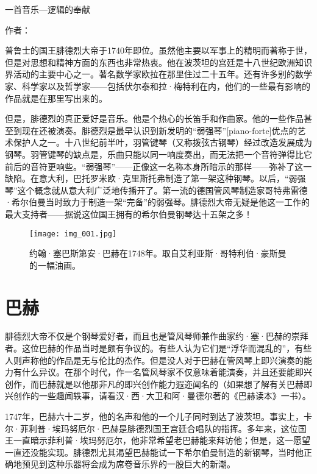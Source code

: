 
\begin{intro}{一首音乐—逻辑的奉献}

\noindent 作者：

普鲁士的国王腓德烈大帝于1740年即位。虽然他主要以军事上的精明而著称于世，但是对思想和精神方面的东西也非常热衷。他在波茨坦的宫廷是十八世纪欧洲知识界活动的主要中心之一。著名数学家欧拉在那里住过二十五年。还有许多别的数学家、科学家以及哲学家——包括伏尔泰和拉·梅特利在内，他们的一些最有影响的作品就是在那里写出来的。

但是，腓德烈的真正爱好是音乐。他是个热心的长笛手和作曲家。他的一些作品甚至到现在还被演奏。腓德烈是最早认识到新发明的“弱强琴”[piano-forte]优点的艺术保护人之一。十八世纪前半叶，羽管键琴（又称拨弦古钢琴）经过改造发展成为钢琴。羽管键琴的缺点是，乐曲只能以同一响度奏出，而无法把一个音符弹得比它前后的音符更响些。“弱强琴”——正像这一名称本身所暗示的那样——弥补了这一缺陷。在意大利，巴托罗米欧·克里斯托弗制造了第一架这种钢琴。以后，“弱强琴”这个概念就从意大利广泛地传播开了。第一流的德国管风琴制造家哥特弗雷德·希尔伯曼当时致力于制造一架“完备”的弱强琴。腓德烈大帝无疑是他这一工作的最大支持者——据说这位国王拥有的希尔伯曼钢琴达十五架之多！

\begin{figure}
\texttt{[image: img\_001.jpg]}
\caption[约翰·塞巴斯第安·巴赫，艾利亚斯·哥特利伯·豪斯曼作。]
  {约翰·塞巴斯第安·巴赫在1748年。取自艾利亚斯·哥特利伯·豪斯曼的一幅油画。}
\end{figure}

\section{巴赫}

腓德烈大帝不仅是个钢琴爱好者，而且也是管风琴师兼作曲家约·塞·巴赫的崇拜者。这位巴赫的作品当时是颇有争议的。有些人认为它们是“浮华而混乱的”，有些人则声称他的作品是无与伦比的杰作。但是没人对于巴赫在管风琴上即兴演奏的能力有什么异议。在那个时代，作一名管风琴家不仅意味着能演奏，并且还要能即兴创作，而巴赫就是以他那非凡的即兴创作能力遐迩闻名的（如果想了解有关巴赫即兴创作的一些趣闻轶事，请看汉·西·大卫和阿·曼德尔著的《巴赫读本》一书）。

1747年，巴赫六十二岁，他的名声和他的一个儿子同时到达了波茨坦。事实上，卡尔·菲利普·埃玛努厄尔·巴赫是腓德烈国王宫廷合唱队的指挥。多年来，这位国王一直暗示菲利普·埃玛努厄尔，他非常希望老巴赫能来拜访他；但是，这一愿望一直还没能实现。腓德烈尤其渴望巴赫能试一下希尔伯曼制造的新钢琴，当时他正确地预见到这种乐器将会成为席卷音乐界的一股巨大的新潮。


\end{intro}

